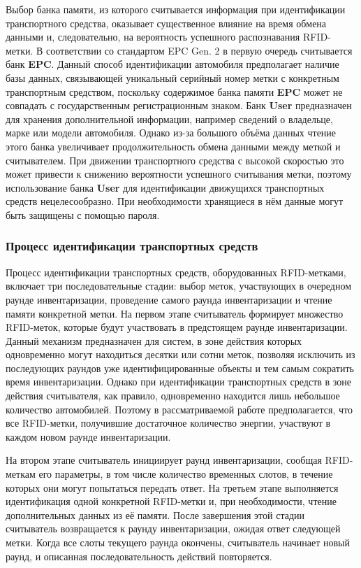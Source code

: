 \documentclass[12pt]{article}
\theoremstyle{definition}
\begin{document}
Выбор банка памяти, из которого считывается информация при идентификации транспортного средства, оказывает существенное влияние на время обмена данными и, следовательно, на вероятность успешного распознавания RFID-метки. В соответствии со стандартом EPC Gen. 2 в первую очередь считывается банк \textbf{EPC}. Данный способ идентификации автомобиля предполагает наличие базы данных, связывающей уникальный серийный номер метки с конкретным транспортным средством, поскольку содержимое банка памяти \textbf{EPC} может не совпадать с государственным регистрационным знаком. Банк \textbf{User} предназначен для хранения дополнительной информации, например сведений о владельце, марке или модели автомобиля. Однако из-за большого объёма данных чтение этого банка увеличивает продолжительность обмена данными между меткой и считывателем. При движении транспортного средства с высокой скоростью это может привести к снижению вероятности успешного считывания метки, поэтому использование банка \textbf{User} для идентификации движущихся транспортных средств нецелесообразно. При необходимости хранящиеся в нём данные могут быть защищены с помощью пароля.

\subsubsection{Процесс идентификации транспортных средств}

Процесс идентификации транспортных средств, оборудованных RFID-метками, включает три последовательные стадии: выбор меток, участвующих в очередном раунде инвентаризации, проведение самого раунда инвентаризации и чтение памяти конкретной метки. На первом этапе считыватель формирует множество RFID-меток, которые будут участвовать в предстоящем раунде инвентаризации. Данный механизм предназначен для систем, в зоне действия которых одновременно могут находиться десятки или сотни меток, позволяя исключить из последующих раундов уже идентифицированные объекты и тем самым сократить время инвентаризации. Однако при идентификации транспортных средств в зоне действия считывателя, как правило, одновременно находится лишь небольшое количество автомобилей. Поэтому в рассматриваемой работе предполагается, что все RFID-метки, получившие достаточное количество энергии, участвуют в каждом новом раунде инвентаризации.

На втором этапе считыватель инициирует раунд инвентаризации, сообщая RFID-меткам его параметры, в том числе количество временных слотов, в течение которых они могут попытаться передать ответ. На третьем этапе выполняется идентификация одной конкретной RFID-метки и, при необходимости, чтение дополнительных данных из её памяти. После завершения этой стадии считыватель возвращается к раунду инвентаризации, ожидая ответ следующей метки. Когда все слоты текущего раунда окончены, считыватель начинает новый раунд, и описанная последовательность действий повторяется.
\end{document}
